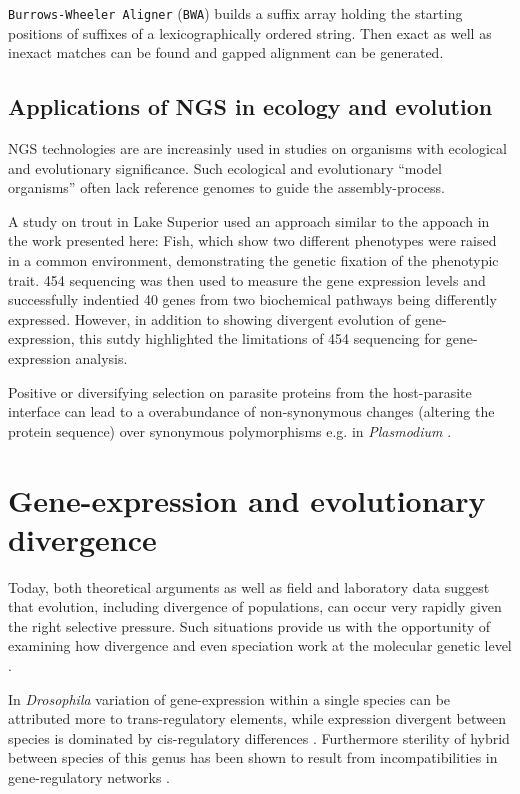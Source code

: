 \texttt{Burrows-Wheeler Aligner} (\texttt{BWA}) \cite{pmid20080505}
builds a suffix array holding the starting positions of suffixes of a
lexicographically ordered string. Then exact as well as inexact
matches can be found and gapped alignment can be generated.

\subsection{Applications of NGS in ecology and evolution}
\label{sec:appl-ngs}

NGS technologies are are increasinly used in studies on organisms with
ecological and evolutionary significance. Such ecological and
evolutionary ``model organisms'' often lack reference genomes to guide
the assembly-process.

A study on trout in Lake Superior \cite{pmid20331779} used an approach
similar to the appoach in the work presented here: Fish, which show
two different phenotypes were raised in a common environment,
demonstrating the genetic fixation of the phenotypic trait. 454
sequencing was then used to measure the gene expression levels and
successfully indentied 40 genes from two biochemical pathways being
differently expressed. However, in addition to showing divergent
evolution of gene-expression, this sutdy highlighted the limitations
of 454 sequencing for gene-expression analysis.

Positive or diversifying selection on parasite proteins from the
host-parasite interface can lead to a overabundance of non-synonymous
changes (altering the protein sequence) over synonymous polymorphisms
e.g. in \textit{Plasmodium} \cite{pmid7630387}.

\section{Gene-expression and evolutionary divergence}

Today, both theoretical arguments as well as field and laboratory data
suggest that evolution, including divergence of populations, can occur
very rapidly given the right selective pressure. Such situations
provide us with the opportunity of examining how divergence and even
speciation work at the molecular genetic level
\cite{via_ecological_2002} .


In \textit{Drosophila} variation of gene-expression within a single
species can be attributed more to trans-regulatory elements, while
expression divergent between species is dominated by cis-regulatory
differences \cite{pmid20354124}. Furthermore sterility of hybrid
between species of this genus has been shown to result from
incompatibilities in gene-regulatory networks \cite{pmid16757655}.


